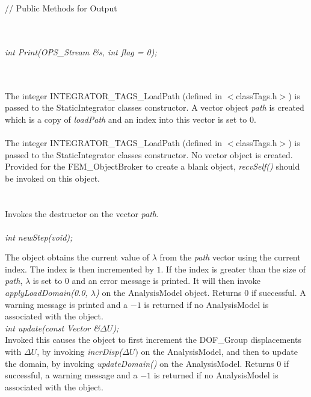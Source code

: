// Public Methods for Output

\\ 
\\ 
{\em int Print(OPS_Stream \&s, int flag = 0);}


 \\
\\ 
The integer INTEGRATOR\_TAGS\_LoadPath (defined in
$<$classTags.h$>$) is passed to the StaticIntegrator classes
constructor. A vector object {\em path} is created which is a copy of
{\em loadPath} and an index into this vector is set to $0$.\\

\\ 
The integer INTEGRATOR\_TAGS\_LoadPath (defined in $<$classTags.h$>$) is
passed to the StaticIntegrator classes constructor. No vector object
is created. Provided for the FEM\_ObjectBroker to create a blank
object, {\em recvSelf()} should be invoked on this object. \\

 \\
\\ 
Invokes the destructor on the vector {\em path}. \\

\\
{\em int newStep(void);} 

The object obtains the current value of $\lambda$ from the {\em path}
vector using the current index. The index is then incremented by
$1$. If the index is greater than the size of {\em path}, $\lambda$ is
set to $0$ and an error message is printed. It will then invoke
{\em applyLoadDomain(0.0, $\lambda$)} on the AnalysisModel
object. Returns $0$ if successful. A warning message is printed and a
$-1$ is returned if no AnalysisModel is associated with the object. \\

{\em int update(const Vector \&$\Delta U$);} \\
Invoked this causes the object to first increment the DOF\_Group
displacements with $\Delta U$, by invoking {\em incrDisp($\Delta U)$}
on the AnalysisModel, and then to update the domain, by invoking {\em
updateDomain()} on the AnalysisModel. Returns $0$ if successful, a
warning message and a $-1$ is returned if no AnalysisModel is
associated with the object. \\


